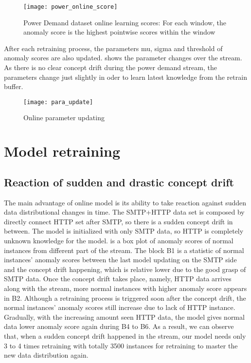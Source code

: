 \begin{figure}[h]
\centering
\texttt{[image: power\_online\_score]}
\caption[Power Demand dataset online learning scores]{Power Demand dataset online learning scores: For each window, the anomaly score is the highest pointwise scores within the window}
\label{fig:power_online}
\end{figure}

After each retraining process, the parameters mu, sigma and threshold of anomaly scores are also updated.  shows the parameter changes over the stream. As there is no clear concept drift during the power demand stream, the parameters change just slightly in oder to learn latest knowledge from the retrain buffer. 

\begin{figure}[h]
\centering
\texttt{[image: para\_update]}
\caption[Online parameter updating]{Online parameter updating}
\label{fig:parachanges}
\end{figure}



\section{Model retraining}
\label{sec:retraining}

\subsection{Reaction of sudden and drastic concept drift}
\label{sec:reaction}
The main advantage of online model is its ability to take reaction against sudden data distributional changes in time. The SMTP+HTTP data set is composed by directly connect HTTP set after SMTP, so there is a sudden concept drift in between. The model is initialized with only SMTP data, so HTTP is completely unknown knowledge for the model.  is a box plot of anomaly scores of normal instances from different part of the stream. The block B1 is a statistic of normal instances’ anomaly scores between the last model updating on the SMTP side and the concept drift happening, which is relative lower due to the good grasp of SMTP data. Once the concept drift takes place, namely, HTTP data arrives along with the stream, more normal instances with higher anomaly score appears in B2. Although a retraining process is triggered soon after the concept drift, the normal instances’ anomaly scores still increase due to lack of HTTP instance. Gradually, with the increasing amount seen HTTP data, the model gives normal data lower anomaly score again during B4 to B6. As a result, we can observe that, when a sudden concept drift happened in the stream, our model needs only 3 to 4 times retraining with totally 3500 instances for retraining to master the new data distribution again.


